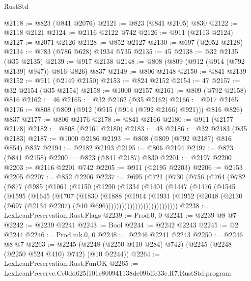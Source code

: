 \begin{lexlean}{RustStd}
\begin{coremodule}
@2118 := @823 (@841 @2076)
@2121 := @823 (@841 @2105) @830
@2122 := @2118 @2121
@2124 := @2116 @2122 @742
@2126 := @911 (@2113 @2124)
@2127 := @2071 @2126
@2128 := @852 @2127
@2130 := @697 (@2052 @2128)
@2134 := @783 (@786 @628) @1934 @735
@2135 := 45
@2138 := @32 @2135 (@35 @2135)
@2139 := @917 @2138
@2148 := @808 (@809 (@912 (@914 (@792 @2139) @947)) @816 @826) @837
@2149 := @806 @2148
@2150 := @841 @2139
@2152 := @911 (@2149 @2150)
@2153 := @824 @2152
@2154 := 47
@2157 := @32 @2154 (@35 @2154)
@2158 := @1000 @2157
@2161 := @809 (@792 @2158) @816
@2162 := 46
@2165 := @32 @2162 (@35 @2162)
@2166 := @917 @2165
@2176 := @808 (@809 (@912 (@915 (@914 (@792 @2166) @921))) @816 @826) @837
@2177 := @806 @2176
@2178 := @841 @2166
@2180 := @911 (@2177 @2178)
@2182 := @808 (@2161 @2180)
@2183 := 48
@2186 := @32 @2183 (@35 @2183)
@2187 := @1000 @2186
@2193 := @808 (@809 (@792 @2187) @816 @854) @837
@2194 := @2182 @2193
@2195 := @806 @2194
@2197 := @823 (@841 @2158)
@2200 := @823 (@841 @2187) @830
@2201 := @2197 @2200
@2203 := @2116 @2201 @742
@2205 := @911 (@2195 @2203)
@2206 := @2153 @2205
@2207 := @852 @2206
@2237 := @695
    (@721
      (@730
        (@756
          (@764
            (@782
              (@877
                (@985
                  (@1061
                    (@1150
                      (@1290
                        (@1334
                          (@1401
                            (@1447
                              (@1476
                                (@1545
                                  (@1595
                                    (@1645
                                      (@1707
                                        (@1830
                                          (@1888
                                            (@1914
                                              (@1931
                                                (@1952
                                                  (@2048
                                                    (@2130
                                                      (@697
                                                        (@2134 @2207)
                                                        (@10 @696)))))))))))))))))))))))))))
@2238 := LexLeanPreservation.Rust.Flags
@2239 := Prod.{0, 0}
@2241 := @2239 @8 @7
@2242 := @2239 @2241
@2243 := Bool
@2244 := @2242 @2243
@2245 := @2 @2244
@2246 := Prod.mk.{0, 0}
@2248 := @2246 @2241 @2243
@2250 := @2246 @8 @7
@2263 := @2245 (@2248 (@2250 @110 @284) @742) (@2245 (@2248 (@2250 @524 @410) @742) (@10 @2244))
@2264 := LexLeanPreservation.Rust.FunOK
@2265 := LexLeanPreserve.Ce0dd625f101e800941138de09bffe33e.R7.RustStd.program

\end{coremodule}
\end{lexlean}
